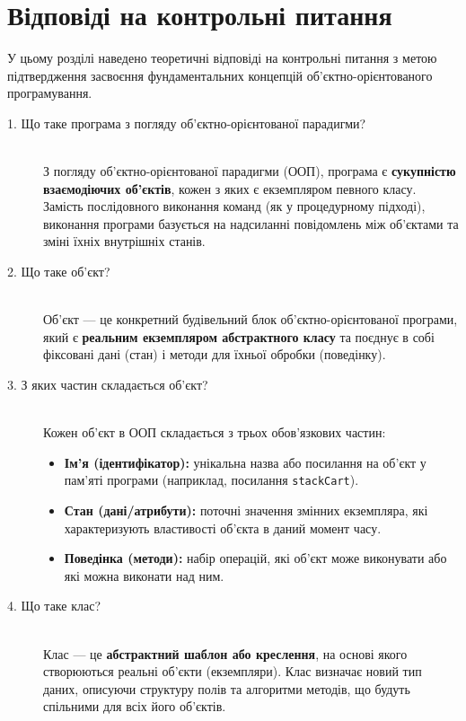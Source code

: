 \section{Відповіді на контрольні питання}

У цьому розділі наведено теоретичні відповіді на контрольні питання з метою 
підтвердження засвоєння фундаментальних концепцій об'єктно-орієнтованого програмування.

\begin{description}
    \item[1. Що таке програма з погляду об'єктно-орієнтованої парадигми?] ~\\
    З погляду об'єктно-орієнтованої парадигми (ООП), програма є \textbf{сукупністю взаємодіючих об'єктів}, 
    кожен з яких є екземпляром певного класу. Замість послідовного виконання команд (як у процедурному 
    підході), виконання програми базується на надсиланні повідомлень між об'єктами та зміні їхніх 
    внутрішніх станів.

    \item[2. Що таке об'єкт?] ~\\
    Об'єкт — це конкретний будівельний блок об'єктно-орієнтованої програми, який 
    є \textbf{реальним екземпляром абстрактного класу} та поєднує в собі фіксовані дані 
    (стан) і методи для їхньої обробки (поведінку).

    \item[3. З яких частин складається об'єкт?] ~\\
    Кожен об'єкт в ООП складається з трьох обов'язкових частин:
    \begin{itemize}
        \item \textbf{Ім'я (ідентифікатор):} унікальна назва або посилання на об'єкт у пам'яті програми (наприклад, посилання \texttt{stackCart}).
        \item \textbf{Стан (дані/атрибути):} поточні значення змінних екземпляра, які характеризують властивості об'єкта в даний момент часу.
        \item \textbf{Поведінка (методи):} набір операцій, які об'єкт може виконувати або які можна виконати над ним.
    \end{itemize}

    \item[4. Що таке клас?] ~\\
    Клас — це \textbf{абстрактний шаблон або креслення}, на основі якого створюються реальні 
    об'єкти (екземпляри). Клас визначає новий тип даних, описуючи структуру полів та алгоритми
     методів, що будуть спільними для всіх його об'єктів.


\end{description}
